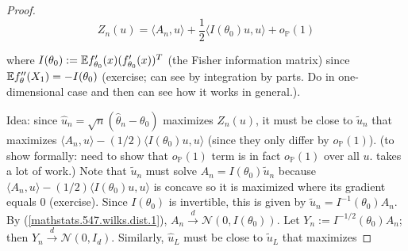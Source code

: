 \begin{proof}
\[
Z_n(u) = \langle A_n, u \rangle + \frac{1}{2} \langle I(\theta_0)u, u \rangle + o_{\mathbb{P}}(1)
\]

where \(I(\theta_0) := \E f_{\theta_0}'(x) ( f_{\theta_0}'(x))^T \) (the Fisher information matrix) since \(\E f_\theta''(X_1) = - I(\theta_0) \) (exercise; can see by integration by parts. Do in one-dimensional case and then can see how it works in general.). 

\begin{center}
\noindent{}
\end{center}

Idea: since \(\hat{u}_n = \sqrt{n}(\hat{\theta}_n - \theta_0)\) maximizes \(Z_n(u)\), it must be close to \(\tilde{u}_n\) that maximizes \(\langle A_n, u \rangle - (1/2) \langle I(\theta_0)u, u \rangle\) (since they only differ by \(o_{\mathbb{P}}(1)\)). (to show formally: need to show that \(o_{\mathbb{P}}(1)\) term is in fact \(o_{\mathbb{P}}(1)\) over all \(u\). takes a lot of work.) Note that \(\tilde{u}_n\) must solve \(A_n = I(\theta_0) \tilde{u}_n\) because \(\langle A_n, u \rangle - (1/2) \langle I(\theta_0)u, u \rangle\) is concave so it is maximized where its gradient equals 0 (exercise). Since \(I(\theta_0)\) is invertible, this is given by \(\tilde{u}_n = I^{-1}(\theta_0) A_n\). By (\ref{mathstats.547.wilks.dist.1}), \(A_n \xrightarrow{d} \mathcal{N}(0, I(\theta_0))\). Let \(Y_n := I^{-1/2}(\theta_0) A_n\); then \(Y_n \xrightarrow{d} \mathcal{N}(0, I_d)\). Similarly, \(\hat{u}_L\) must be close to \(\tilde{u}_L\) that maximizes 


\end{proof}

